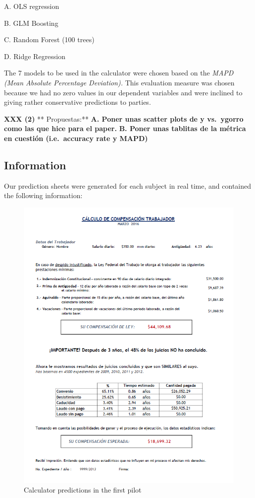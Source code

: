 \documentclass[]{article}
\begin{document}
A. OLS regression

B. GLM Boosting

C. Random Forest (100 trees)

D. Ridge Regression

The 7 models to be used in the calculator were chosen based on the
\emph{MAPD (Mean Absolute Percentage Deviation).} This evaluation
measure was chosen because we had no zero values in our dependent
variables and were inclined to giving rather conservative predictions to
parties.

\textbf{XXX (2) } ** Propuestas:** \textbf{A. Poner unas scatter plots
de y vs.~ygorro como las que hice para el paper. } \textbf{B. Poner unas
tablitas de la métrica en cuestión (i.e.~accuracy rate y MAPD)}

\subsection{Information}\label{information}

Our prediction sheets were generated for each subject in real time, and
contained the following information:

\begin{figure}[htbp]
\centering
\includegraphics{../Paper/Figuras/calctreat.png}
\caption{Calculator predictions in the first pilot}
\end{figure}
\end{document}
